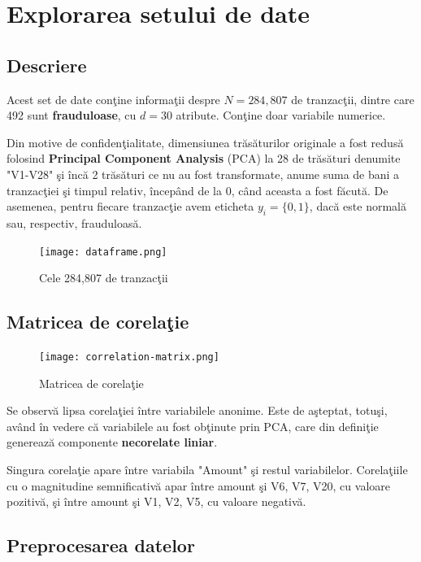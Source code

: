 \chapter{Explorarea setului de date}

\section{Descriere}

Acest set de date\cite{kaggle-dataset} conţine informaţii despre $N=284,807$
de tranzacţii, dintre care 
492 sunt \textbf{frauduloase}, cu $d=30$ atribute. Conţine doar variabile numerice.

Din motive de confidenţialitate, dimensiunea trăsăturilor originale a fost 
redusă folosind \textbf{Principal Component Analysis} (PCA) la 28 de trăsături denumite 
"V1-V28" şi încă 2 trăsături ce nu au fost transformate, anume suma de bani
a tranzacţiei şi timpul relativ, începând de la 0, când aceasta a fost făcută. 
De asemenea, pentru fiecare tranzacţie avem eticheta $y_i = \{0, 1\}$, dacă este normală 
sau, respectiv, frauduloasă.

\begin{figure}[H]
    \texttt{[image: dataframe.png]}
    \caption{Cele 284,807 de tranzacţii}
\end{figure}


\section{Matricea de corelaţie}

\begin{figure}[H]
    \texttt{[image: correlation-matrix.png]}
    \caption{Matricea de corelaţie}
\end{figure}

Se observă lipsa corelaţiei între variabilele anonime. Este de aşteptat, totuşi, 
având în vedere că variabilele au fost obţinute prin PCA, care din definiţie generează 
componente \textbf{necorelate liniar}.

Singura corelaţie apare între variabila "Amount" şi restul variabilelor. Corelaţiile
cu o magnitudine semnificativă apar între amount şi V6, V7, V20, cu valoare pozitivă, 
şi între amount şi V1, V2, V5, cu valoare negativă.

\section{Preprocesarea datelor}

